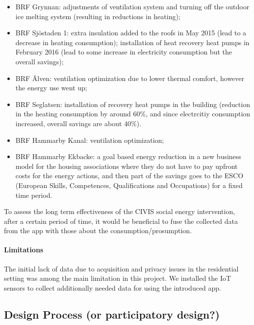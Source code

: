 \begin{itemize}
	\setlength{\itemsep}{0mm}
	\item BRF	Grynnan: adjustments of	ventilation	system and	turning	off	the	outdoor	ice	melting	system (resulting in	reductions	in	heating);
	\item BRF	 Sj\"ostaden	 1: extra	 insulation	 added	 to	 the	 roofs in	May	2015	(lead	to	a	decrease	in	heating	consumption);	 installation	 of	 heat	 recovery	 heat	 pumps	 in	 February	 2016 (lead	 to	 some	 increase	 in	 electricity	 consumption	 but	 the	 overall	savings);
	\item BRF	\"Alven: ventilation	optimization due to lower thermal comfort,	however	the	energy	use	went	up;
	\item BRF	 Seglatsen: installation of recovery	heat	pumps	in	 the	building (reduction in	 the	heating	consumption	by	around	60\%, and since electrcitiy consumption increased, overall savings are	about	40\%).	
	\item BRF	 Hammarby	 Kanal:	 ventilation optimization;
	\item BRF	 Hammarby	 Ekbacke: a goal	 based	 energy	 reduction in	a	new	business	model	for	the	housing	associations	where	 they do not	 have	 to	 pay upfront	costs	for	the energy 	actions, and then part	of	the	savings	goes to	the	 ESCO (European Skills, Competences, Qualifications and Occupations)	 for	 a	 fixed	 time	 period.	
\end{itemize}


To assess the long term effectiveness of the CIVIS social energy intervention,  after a certain period of time, it would be beneficial to fuse the collected data from the app with those about the consumption/prosumption. 

\paragraph{Limitations} The initial lack of data due to acquisition and privacy issues in the residential setting was among the main limitation in this project. We installed the IoT sensors to collect additionally needed data for using the introduced app. 

\subsection{Design Process (or participatory design?)}


